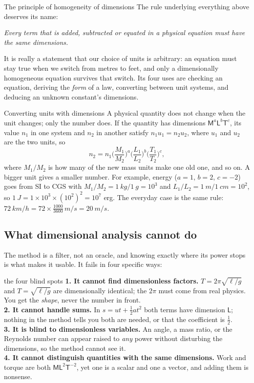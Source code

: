 \begin{defbox}{The principle of homogeneity of dimensions}
The rule underlying everything above deserves its name:
\begin{center}
\emph{Every term that is added, subtracted or equated in a physical equation must have the same
dimensions.}
\end{center}
It is really a statement that our choice of units is arbitrary: an equation must stay true when we
switch from metres to feet, and only a dimensionally homogeneous equation survives that switch. Its four
uses are checking an equation, deriving the \emph{form} of a law, converting between unit systems, and
deducing an unknown constant's dimensions.
\end{defbox}

\begin{methodbox}{Converting units with dimensions}
A physical quantity does not change when the unit changes; only the number does. If the quantity has
dimensions $\mathsf{M}^a\mathsf{L}^b\mathsf{T}^c$, its value $n_1$ in one system and $n_2$ in another
satisfy $n_1u_1=n_2u_2$, where $u_1$ and $u_2$ are the two units, so
\[
n_2=n_1\Big(\frac{M_1}{M_2}\Big)^{a}\Big(\frac{L_1}{L_2}\Big)^{b}\Big(\frac{T_1}{T_2}\Big)^{c},
\]
where $M_1/M_2$ is how many of the new mass units make one old one, and so on. A bigger unit gives a
smaller number. For example, energy ($a=1$, $b=2$, $c=-2$) goes from SI to CGS with
$M_1/M_2=\SI{1}{kg}/\SI{1}{g}=10^{3}$ and $L_1/L_2=\SI{1}{m}/\SI{1}{cm}=10^{2}$, so
$\SI{1}{J}=1\times10^{3}\times(10^{2})^{2}=10^{7}$ erg. The everyday case is the same rule:
$\SI{72}{km/h}=72\times\frac{1000}{3600}\,\si{m/s}=\SI{20}{m/s}$.
\end{methodbox}

\subsection{What dimensional analysis cannot do}

The method is a filter, not an oracle, and knowing exactly where its power stops is what makes it usable.
It fails in four specific ways:

\begin{trapbox}{the four blind spots}
\textbf{1. It cannot find dimensionless factors.} $T=2\pi\sqrt{\ell/g}$ and $T=\sqrt{\ell/g}$ are
dimensionally identical; the $2\pi$ must come from real physics. You get the \emph{shape}, never the
number in front.\\[3pt]
\textbf{2. It cannot handle sums.} In $s=ut+\tfrac12at^2$ both terms have dimension $\mathsf L$; nothing
in the method tells you both are needed, or that the coefficient is $\tfrac12$.\\[3pt]
\textbf{3. It is blind to dimensionless variables.} An angle, a mass ratio, or the Reynolds number can
appear raised to \emph{any} power without disturbing the dimensions, so the method cannot see it.\\[3pt]
\textbf{4. It cannot distinguish quantities with the same dimensions.} Work and torque are both
$\mathsf M\mathsf L^2\mathsf T^{-2}$, yet one is a scalar and one a vector, and adding them is nonsense.
\end{trapbox}

